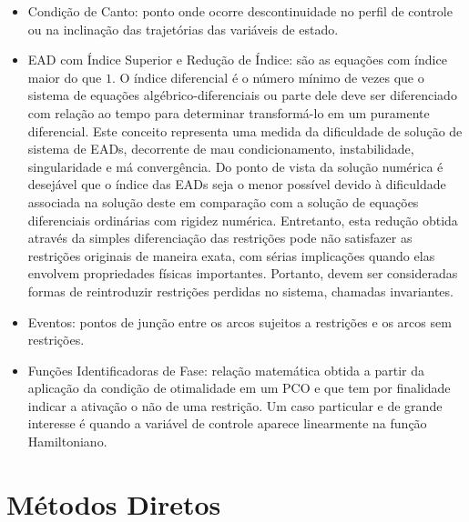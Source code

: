 \begin{itemize}
\item Condição de Canto: ponto onde ocorre descontinuidade no perfil de controle ou na inclinação das trajetórias das variáveis de estado. 

\item EAD com Índice Superior e Redução de Índice: são as equações com índice maior do que $1$. O índice diferencial é o número mínimo de vezes que o sistema de equações algébrico-diferenciais ou parte dele deve ser diferenciado com relação ao tempo para determinar transformá-lo em um puramente diferencial. Este conceito representa uma medida da dificuldade de solução de sistema de EADs, decorrente de mau condicionamento, instabilidade, singularidade e má convergência. Do ponto de vista da solução numérica é desejável que o índice das EADs seja o menor possível devido à dificuldade associada na solução deste em comparação com a solução de equações diferenciais ordinárias com rigidez numérica. Entretanto,
esta redução obtida através da simples diferenciação das restrições pode não satisfazer as restrições originais de maneira exata, com sérias implicações quando elas envolvem propriedades físicas importantes. Portanto, devem ser consideradas formas de reintroduzir restrições perdidas no sistema, chamadas invariantes.

\item Eventos: pontos de junção entre os arcos sujeitos a restrições e os arcos sem
restrições.

\item Funções Identificadoras de Fase: relação matemática obtida a partir da aplicação da condição de otimalidade em um PCO e que tem por finalidade indicar a ativação o não de uma restrição. Um caso particular e de grande interesse é quando a variável de controle aparece linearmente na função Hamiltoniano. 

\end{itemize}


\section{Métodos Diretos}

